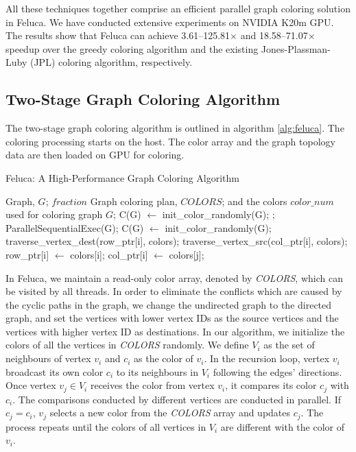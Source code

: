 All these techniques together comprise an efficient parallel graph coloring 
solution in Feluca. We have conducted extensive experiments on NVIDIA K20m GPU. The results 
show that Feluca can achieve 3.61--125.81$\times$ and 18.58--71.07$\times$ speedup over the greedy coloring algorithm and 
 the existing Jones-Plassman-Luby (JPL) coloring algorithm, respectively. 


\subsection{Two-Stage Graph Coloring Algorithm}
\label{two-stage}

The two-stage graph coloring algorithm is outlined in algorithm %
\ref{alg:feluca}. The coloring processing starts on the host. The color array and the graph topology data are then loaded on GPU for coloring. 

\begin{algorithm}[h]
	\caption{Feluca: A High-Performance Graph Coloring Algorithm}
	\label{alg:feluca}
		\begin{algorithmic}[1] %
		\Require Graph, $G$; $fraction$
		\Ensure Graph coloring plan, $COLORS$; and the colors $color\_num$ used for coloring graph $G$;
			\State C(G) $\leftarrow$ init\_color\_randomly(G);
						;
					\EndIf
				\EndWhile
					\State ParallelSequentialExec(G);
				\EndIf
			\EndWhile
		\EndFunction
			\State C(G) $\leftarrow$ init\_color\_randomly(G);
					\State traverse\_vertex\_dest(row\_ptr[i], colors);
					\State traverse\_vertex\_src(col\_ptr[i], colors);
					\State row\_ptr[i] $\leftarrow$ colors[i];
					\State col\_ptr[i] $\leftarrow$ colors[j];
				\EndWhile
			\EndFunction
	\end{algorithmic}
\end{algorithm}


In Feluca, we maintain a read-only color array, denoted by \emph{COLORS}, which can be visited by all 
threads. In order to eliminate the conflicts which are caused by the cyclic paths in the graph, we 
change the undirected graph to the directed graph, and set the vertices with lower 
vertex IDs as the source vertices and the vertices with higher vertex ID as destinations.
In our algorithm, we initialize the colors of all the vertices in \emph{COLORS} randomly. 
We define $V_i$ as the set of neighbours of vertex $v_i$ and $c_i$ as the color of $v_i$. 
In the recursion loop, vertex $v_i$ broadcast its own color $c_i$ to its neighbours in $V_i$ following the edges' directions. Once vertex $v_j \in V_i$ receives the color from vertex $v_i$, it compares its color $c_j$ with $c_i$. The comparisons conducted by different vertices are conducted in parallel. If $c_j = c_i$, $v_j$ selects a new color from the \emph{COLORS} array and updates $c_j$. The process repeats until the colors of all vertices in $V_i$ are different 
with the color of $v_i$. 

